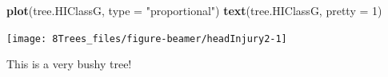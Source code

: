\documentclass[10pt,ignorenonframetext,]{beamer}
\newenvironment{Shaded}{\begin{snugshade}}{\end{snugshade}}
\newcommand{\KeywordTok}[1]{\textcolor[rgb]{0.13,0.29,0.53}{\textbf{#1}}}
\newcommand{\DataTypeTok}[1]{\textcolor[rgb]{0.13,0.29,0.53}{#1}}
\newcommand{\DecValTok}[1]{\textcolor[rgb]{0.00,0.00,0.81}{#1}}
\newcommand{\StringTok}[1]{\textcolor[rgb]{0.31,0.60,0.02}{#1}}
\newcommand{\NormalTok}[1]{#1}
\begin{document}
\begin{frame}[fragile]

\scriptsize

\begin{Shaded}
\begin{Highlighting}[]
\KeywordTok{plot}\NormalTok{(tree.HIClassG, }\DataTypeTok{type =} \StringTok{"proportional"}\NormalTok{)}
\KeywordTok{text}\NormalTok{(tree.HIClassG, }\DataTypeTok{pretty =} \DecValTok{1}\NormalTok{)}
\end{Highlighting}
\end{Shaded}

\begin{center}\texttt{[image: 8Trees\_files/figure-beamer/headInjury2-1]} \end{center}

\normalsize

This is a very bushy tree!

\end{frame}
\end{document}
